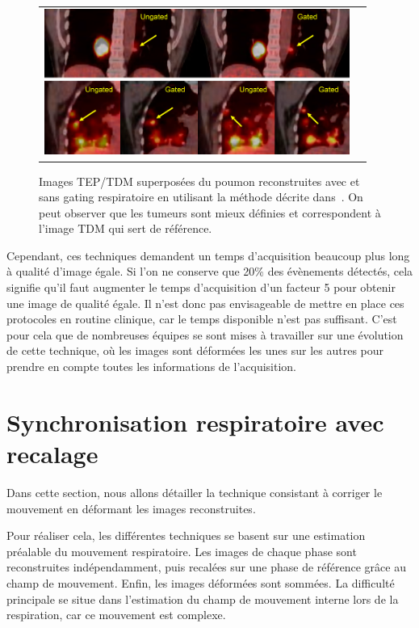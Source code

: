 \begin{figure}[h!]
	\begin{center}
		\begin{tabular}{c c}
			\includegraphics[width=10cm]{images/chang2010}
		\end{tabular}
	\end{center}
	\caption[Images TEP/TDM superposées du poumon]{Images TEP/TDM superposées du poumon reconstruites avec et sans gating respiratoire en utilisant la méthode décrite dans~\cite{GuopingChang2010Implementation}. On peut observer que les tumeurs sont mieux définies et correspondent à l'image TDM qui sert de référence.} 
	\label{fig:chang2010}
\end{figure}

Cependant, ces techniques demandent un temps d'acquisition beaucoup plus long à qualité d'image égale. Si l'on ne conserve que 20\% des évènements détectés, cela signifie qu'il faut augmenter le temps d'acquisition d'un facteur 5 pour obtenir une image de qualité égale. Il n'est donc pas envisageable de mettre en place ces protocoles en routine clinique, car le temps disponible n'est pas suffisant. C'est pour cela que de nombreuses équipes se sont mises à travailler sur une évolution de cette technique, où les images sont déformées les unes sur les autres pour prendre en compte toutes les informations de l'acquisition.

\section{Synchronisation respiratoire avec recalage}
\label{lab:corrPostRecon}

Dans cette section, nous allons détailler la technique consistant à corriger  le mouvement en déformant les images reconstruites.

Pour réaliser cela, les différentes techniques se basent sur une estimation préalable du mouvement respiratoire. Les images de chaque phase sont reconstruites indépendamment, puis recalées sur une phase de référence grâce au champ de mouvement. Enfin, les images déformées sont sommées. La difficulté principale se situe dans l'estimation du champ de mouvement interne lors de la respiration, car ce mouvement est complexe.

